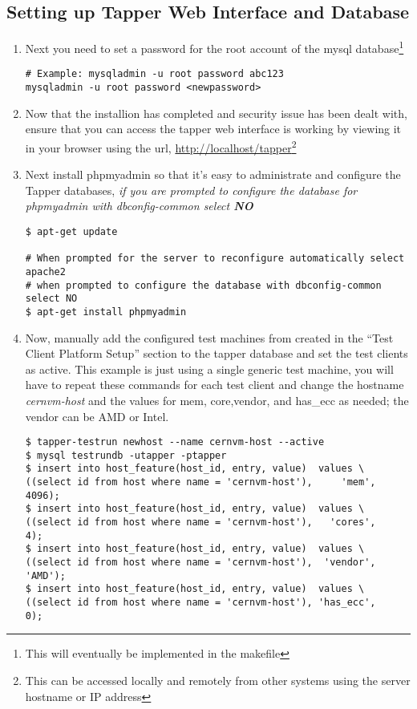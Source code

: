 \subsection{Setting up Tapper Web Interface and Database}
\begin{enumerate}
\item Next you need to set a password for the root account of the mysql database\footnote{This will eventually be implemented in the makefile}
\lstset{caption= Set MySQL Root Password}
\begin{lstlisting}
# Example: mysqladmin -u root password abc123
mysqladmin -u root password <newpassword>
\end{lstlisting}

\item Now that the installion has completed and security issue has been dealt with, ensure that you can access the tapper web
interface is working by viewing it in your browser using the url,  
\url{http://localhost/tapper}\footnote{This can be accessed locally and remotely from other systems using the server hostname or IP address}

\item Next install phpmyadmin so that it's easy to administrate and configure the Tapper databases, \emph{if you are prompted to 
configure the database for phpmyadmin with dbconfig-common select {\bf NO} } 
\lstset{caption= Install PHPMyAdmin}
\begin{lstlisting}
$ apt-get update

# When prompted for the server to reconfigure automatically select apache2
# when prompted to configure the database with dbconfig-common select NO
$ apt-get install phpmyadmin
\end{lstlisting}

\item Now, manually add the configured test machines from created in the ``Test Client Platform Setup'' section to the
tapper database and set the test clients as active. This example is just using a single generic test machine, you will
have to repeat these commands for each test client and change the hostname \emph{cernvm-host} and the values for mem,
core,vendor, and has\_ecc as needed; the vendor can be AMD or Intel.
\lstset{caption= Adding Test Clients to Tapper Database}
\begin{lstlisting}
$ tapper-testrun newhost --name cernvm-host --active
$ mysql testrundb -utapper -ptapper
$ insert into host_feature(host_id, entry, value)  values \
((select id from host where name = 'cernvm-host'),     'mem',  4096);
$ insert into host_feature(host_id, entry, value)  values \
((select id from host where name = 'cernvm-host'),   'cores',     4);
$ insert into host_feature(host_id, entry, value)  values \
((select id from host where name = 'cernvm-host'),  'vendor', 'AMD');
$ insert into host_feature(host_id, entry, value)  values \
((select id from host where name = 'cernvm-host'), 'has_ecc',     0);
\end{lstlisting}



\end{enumerate}
